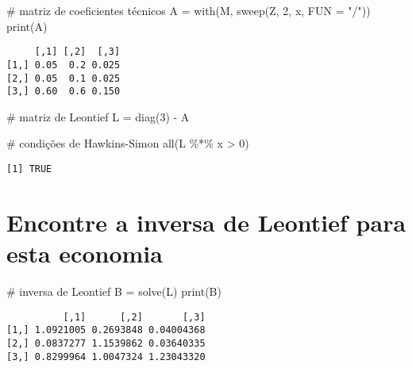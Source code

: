 \documentclass[
  letterpaper,
  DIV=11,
  numbers=noendperiod]{scrreprt}
\newenvironment{Shaded}{\begin{snugshade}}{\end{snugshade}}
\newcommand{\AttributeTok}[1]{\textcolor[rgb]{0.80,0.80,0.80}{#1}}
\newcommand{\CommentTok}[1]{\textcolor[rgb]{0.50,0.62,0.50}{#1}}
\newcommand{\DecValTok}[1]{\textcolor[rgb]{0.86,0.86,0.80}{#1}}
\newcommand{\FunctionTok}[1]{\textcolor[rgb]{0.94,0.94,0.56}{#1}}
\newcommand{\NormalTok}[1]{\textcolor[rgb]{0.80,0.80,0.80}{#1}}
\newcommand{\OtherTok}[1]{\textcolor[rgb]{0.94,0.94,0.56}{#1}}
\newcommand{\SpecialCharTok}[1]{\textcolor[rgb]{0.86,0.64,0.64}{#1}}
\newcommand{\StringTok}[1]{\textcolor[rgb]{0.80,0.58,0.58}{#1}}
\begin{document}
\begin{Shaded}
\begin{Highlighting}[numbers=left,,]
\CommentTok{\# matriz de coeficientes técnicos}
\NormalTok{A }\OtherTok{=} \FunctionTok{with}\NormalTok{(M, }\FunctionTok{sweep}\NormalTok{(Z, }\DecValTok{2}\NormalTok{, x, }\AttributeTok{FUN =} \StringTok{"/"}\NormalTok{))}
\FunctionTok{print}\NormalTok{(A)}
\end{Highlighting}
\end{Shaded}

\begin{verbatim}
     [,1] [,2]  [,3]
[1,] 0.05  0.2 0.025
[2,] 0.05  0.1 0.025
[3,] 0.60  0.6 0.150
\end{verbatim}

\begin{Shaded}
\begin{Highlighting}[numbers=left,,]
\CommentTok{\# matriz de Leontief}
\NormalTok{L }\OtherTok{=} \FunctionTok{diag}\NormalTok{(}\DecValTok{3}\NormalTok{) }\SpecialCharTok{{-}}\NormalTok{ A}

\CommentTok{\# condições de Hawkins{-}Simon}
\FunctionTok{all}\NormalTok{(L }\SpecialCharTok{\%*\%}\NormalTok{ x }\SpecialCharTok{\textgreater{}} \DecValTok{0}\NormalTok{)}
\end{Highlighting}
\end{Shaded}

\begin{verbatim}
[1] TRUE
\end{verbatim}

\section{Encontre a inversa de Leontief para esta
economia}\label{encontre-a-inversa-de-leontief-para-esta-economia}

\begin{Shaded}
\begin{Highlighting}[numbers=left,,]
\CommentTok{\# inversa de Leontief}
\NormalTok{B }\OtherTok{=} \FunctionTok{solve}\NormalTok{(L)}
\FunctionTok{print}\NormalTok{(B)}
\end{Highlighting}
\end{Shaded}

\begin{verbatim}
          [,1]      [,2]       [,3]
[1,] 1.0921005 0.2693848 0.04004368
[2,] 0.0837277 1.1539862 0.03640335
[3,] 0.8299964 1.0047324 1.23043320
\end{verbatim}
\end{document}
